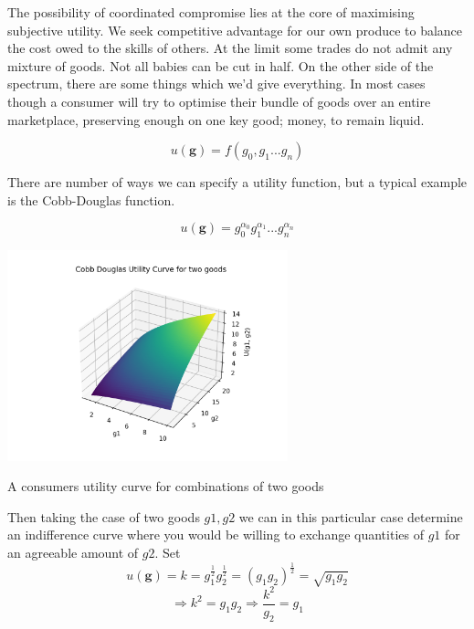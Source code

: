 \documentclass{tufte-handout}
\begin{document}
The possibility of coordinated compromise lies at the core of maximising subjective utility. We seek competitive advantage for our own produce to balance the cost owed to the skills of others. At the limit some trades do not admit any mixture of goods. Not all babies can be cut in half. On the other side of the spectrum, there are some things which we'd give everything. In most cases though a consumer will try to optimise their bundle of goods over an entire marketplace, preserving enough on one key good; money, to remain liquid. 

$$ u(\mathbf{g}) = f(g_{0}, g_{1} ... g_{n}) $$

There are number of ways we can specify a utility function, but a typical example is the Cobb-Douglas function. 

$$ u(\mathbf{g}) = g_{0}^{\alpha_{0}}g_{1}^{\alpha_{1}} ... g_{n}^{\alpha_{n}}$$

\begin{marginfigure}
\includegraphics[width=3.2in, height=5.in]{Plots/cobb_douglas_utility.png}
\caption{A consumers utility curve for combinations of two goods}
\end{marginfigure} 

Then taking the case of two goods $g1, g2$ we can in this particular case determine an indifference curve where you would be willing to exchange quantities of $g1$ for an agreeable amount of $g2$.  Set 
$$u(\mathbf{g}) = k =  g_{1}^{\frac{1}{2}}g_{2}^{\frac{1}{2}} = (g_{1}g_{2})^{\frac{1}{2}}  = \sqrt{g_{1}g_{2}}$$
$$ \Rightarrow k^{2} = g_{1}g_{2} \Rightarrow \frac{k^{2}}{g_{2}} = g_{1}$$
\end{document}
